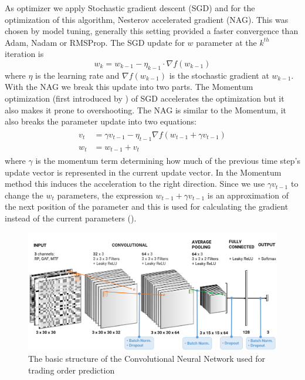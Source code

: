 \documentclass[11pt, a4paper]{article}
\begin{document}
As optimizer we apply Stochastic gradient descent (SGD) and for the optimization of this algorithm, Nesterov accelerated gradient (NAG). This was chosen by model tuning, generally this setting provided a faster convergence than Adam, Nadam or RMSProp. The SGD update for $w$ parameter at the $k^{th}$ iteration is
\begin{equation}
    \label{eq:SGD}
    w_k = w_{k-1} - \eta_{k-1} \cdot \nabla f(w_{k-1})
\end{equation}
where $\eta$ is the learning rate and $\nabla f(w_{k-1})$ is the stochastic gradient at $w_{k-1}$. With the NAG we break this update into two parts. The Momentum optimization (first introduced by \cite{polyak1964some}) of SGD accelerates the optimization but it also makes it prone to overshooting. The NAG is similar to the Momentum, it also breaks the parameter update into two equations:
\begin{align}
\label{eq:NAG}
    \begin{split}
        v_t &  = \gamma v_{t-1} - \eta_{t-1} \nabla f(w_{t-1} + \gamma v_{t-1}) \\
        w_t & = w_{t-1} + v_t 
    \end{split}
\end{align}
where $\gamma$ is the momentum term determining how much of the previous time step's update vector is represented in the current update vector. In the Momentum method this induces the acceleration to the right direction. Since we use $\gamma v_{t-1}$ to change the $w_t$ parameters, the expression $w_{t-1} + \gamma v_{t-1}$ is an approximation of the next position of the parameter and this is used for calculating the gradient instead of the current parameters (\cite{ruder2016overview}).

\begin{figure}[ht]
    \centering
    \includegraphics[width=\textwidth]{images/CNNCtrf.png}
    \caption{The basic structure of the Convolutional Neural Network used for trading order prediction}
    \label{fig:CNNstruct}
\end{figure}
\end{document}
